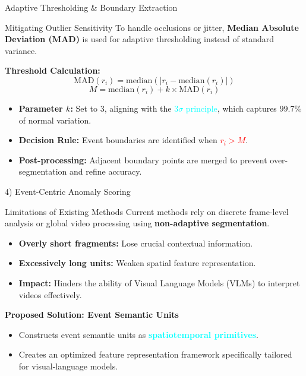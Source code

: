 \documentclass[aspectratio=169,xcolor=dvipsnames]{beamer}
\begin{document}
	
	
	\begin{frame}{Adaptive Thresholding \& Boundary Extraction}
		\small
		
		\begin{block}{Mitigating Outlier Sensitivity}
			To handle occlusions or jitter, \textbf{Median Absolute Deviation (MAD)} is used for adaptive thresholding instead of standard variance.
		\end{block}
		
		\vspace{0.5em}
		\textbf{Threshold Calculation:}
		\[
		\mathrm{MAD}(r_i) = \mathrm{median}(|r_i - \mathrm{median}(r_i)|)
		\]
		\[
		M = \mathrm{median}(r_i) + k \times \mathrm{MAD}(r_i)
		\]
		
		\begin{itemize}
			\item \textbf{Parameter $k$:} Set to $3$, aligning with the \textcolor{cyan}{$3\sigma$ principle}, which captures $99.7\%$ of normal variation.
			\item \textbf{Decision Rule:} Event boundaries are identified when \textcolor{red}{$r_i > M$}.
			\item \textbf{Post-processing:} Adjacent boundary points are merged to prevent over-segmentation and refine accuracy.
		\end{itemize}
	\end{frame}
	
	
	\begin{frame}{4) Event-Centric Anomaly Scoring}
		\small
		
		\begin{alertblock}{Limitations of Existing Methods}
			Current methods rely on discrete frame-level analysis or global video processing using \textbf{non-adaptive segmentation}.
			\begin{itemize}
				\item \textbf{Overly short fragments:} Lose crucial contextual information.
				\item \textbf{Excessively long units:} Weaken spatial feature representation.
				\item \textbf{Impact:} Hinders the ability of Visual Language Models (VLMs) to interpret videos effectively.
			\end{itemize}
		\end{alertblock}
		
		\vspace{0.5em}
		\textbf{Proposed Solution: Event Semantic Units} \\
		\begin{itemize}
			\item Constructs event semantic units as \textcolor{cyan}{\textbf{spatiotemporal primitives}}.
			\item Creates an optimized feature representation framework specifically tailored for visual-language models.
		\end{itemize}
	\end{frame}
	
\end{document}
